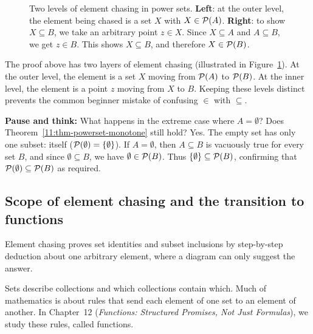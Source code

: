 \begin{figure}[htbp]
\caption{Two levels of element chasing in power sets. \textbf{Left}: at the outer level, the element being chased is a set $X$ with $X \in \mathcal{P}(A)$. \textbf{Right}: to show $X \subseteq B$, we take an arbitrary point $z \in X$. Since $X \subseteq A$ and $A \subseteq B$, we get $z \in B$. This shows $X \subseteq B$, and therefore $X \in \mathcal{P}(B)$.}
\label{11:fig-power-set-levels}
\end{figure}

\begin{labbox}
The proof above has two layers of element chasing (illustrated in Figure~\ref{11:fig-power-set-levels}). At the outer level, the element is a set $X$ moving from $\mathcal{P}(A)$ to $\mathcal{P}(B)$. At the inner level, the element is a point $z$ moving from $X$ to $B$. Keeping these levels distinct prevents the common beginner mistake of confusing $\in$ with $\subseteq$.
\end{labbox}

\begin{intuitionbox}
\textbf{Pause and think:} What happens in the extreme case where $A = \emptyset$? Does Theorem~\ref{11:thm-powerset-monotone} still hold? Yes. The empty set has only one subset: itself ($\mathcal{P}(\emptyset) = \{\emptyset\}$). If $A = \emptyset$, then $A \subseteq B$ is vacuously true for every set $B$, and since $\emptyset \subseteq B$, we have $\emptyset \in \mathcal{P}(B)$. Thus $\{\emptyset\} \subseteq \mathcal{P}(B)$, confirming that $\mathcal{P}(\emptyset) \subseteq \mathcal{P}(B)$ as required.
\end{intuitionbox}

\subsection{Scope of element chasing and the transition to functions}

Element chasing proves set identities and subset inclusions by step-by-step deduction about one arbitrary element, where a diagram can only suggest the answer.

Sets describe collections and which collections contain which. Much of mathematics is about rules that send each element of one set to an element of another. In Chapter~12 (\emph{Functions: Structured Promises, Not Just Formulas}), we study these rules, called functions.

